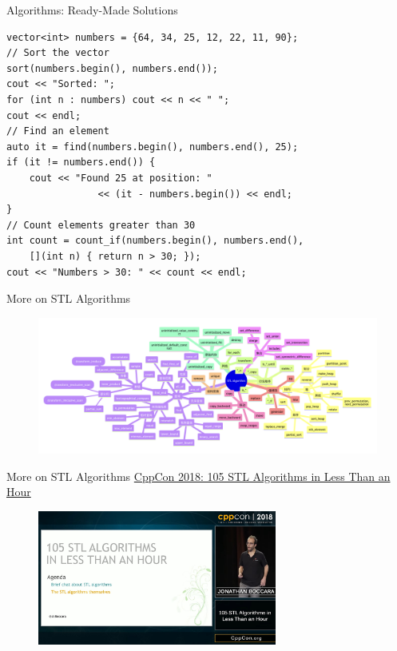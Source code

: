 \begin{frame}[fragile]{Algorithms: Ready-Made Solutions}
	\begin{verbatim}
vector<int> numbers = {64, 34, 25, 12, 22, 11, 90};
// Sort the vector
sort(numbers.begin(), numbers.end());
cout << "Sorted: ";
for (int n : numbers) cout << n << " ";
cout << endl;
// Find an element
auto it = find(numbers.begin(), numbers.end(), 25);
if (it != numbers.end()) {
    cout << "Found 25 at position: "
                << (it - numbers.begin()) << endl;
}
// Count elements greater than 30
int count = count_if(numbers.begin(), numbers.end(),
    [](int n) { return n > 30; });
cout << "Numbers > 30: " << count << endl;
    \end{verbatim}
\end{frame}

\begin{frame}[fragile]{More on STL Algorithms}
	\begin{figure}
		\includegraphics[width=\textwidth]{day8_pm/img/2-algorithms}
	\end{figure}
\end{frame}

\begin{frame}[fragile]{More on STL Algorithms}
	\textcolor{blue}{\href{https://www.youtube.com/watch?v=2olsGf6JIkU&ab_channel=CppCon}{CppCon 2018: 105 STL Algorithms in Less Than an Hour}}
	\begin{figure}
		\includegraphics[width=0.7\textwidth]{day8_pm/img/2-cppcon2018}
	\end{figure}
\end{frame}

